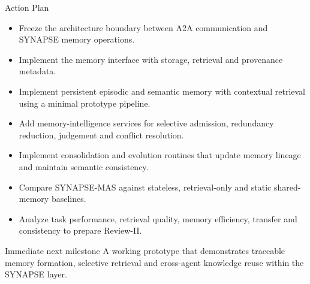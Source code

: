 \begin{frame}{Action Plan}
\begin{itemize}[leftmargin=1.5em,itemsep=4pt,topsep=4pt]
\item Freeze the architecture boundary between A2A communication and SYNAPSE memory operations.
\item Implement the memory interface with storage, retrieval and provenance metadata.
\item Implement persistent episodic and semantic memory with contextual retrieval using a minimal prototype pipeline.
\item Add memory-intelligence services for selective admission, redundancy reduction, judgement and conflict resolution.
\item Implement consolidation and evolution routines that update memory lineage and maintain semantic consistency.
\item Compare SYNAPSE-MAS against stateless, retrieval-only and static shared-memory baselines.
\item Analyze task performance, retrieval quality, memory efficiency, transfer and consistency to prepare Review-II.
\end{itemize}
\vspace{2mm}
\begin{exampleblock}{Immediate next milestone}
A working prototype that demonstrates traceable memory formation, selective retrieval and cross-agent knowledge reuse within the SYNAPSE layer.
\end{exampleblock}
\end{frame}
